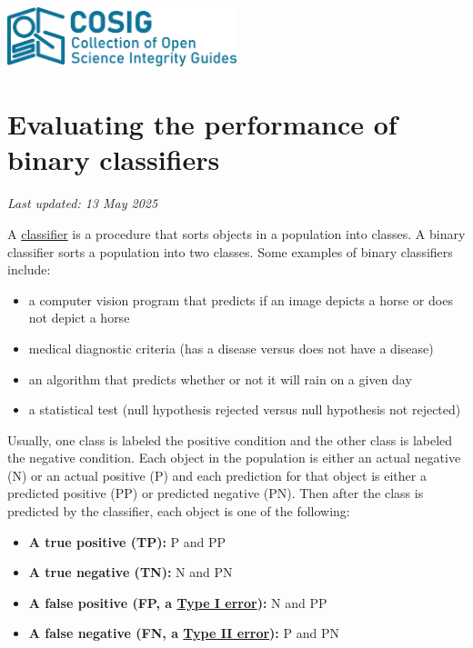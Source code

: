 \documentclass[letterpaper, 12pt]{article}
\begin{document}
\flushleft
\includegraphics[width=0.5\textwidth]{img/home/241017_final_logo_mockup.png}

\section*{Evaluating the performance of binary classifiers}
\textit{Last updated: 13 May 2025}

A \href{https://en.wikipedia.org/wiki/Classification_rule}{classifier} is a procedure that sorts objects in a population into classes. A binary classifier sorts a population into two classes. Some examples of binary classifiers include:

\begin{itemize}
    \setlength\itemsep{-0.5em}
    \item a computer vision program that predicts if an image depicts a horse or does not depict a horse
    \item medical diagnostic criteria (has a disease versus does not have a disease)
    \item an algorithm that predicts whether or not it will rain on a given day
    \item a statistical test (null hypothesis rejected versus null hypothesis not rejected)
\end{itemize}

Usually, one class is labeled the positive condition and the other class is labeled the negative condition. Each object in the population is either an actual negative (N) or an actual positive (P) and each prediction for that object is either a predicted positive (PP) or predicted negative (PN). Then after the class is predicted by the classifier, each object is one of the following:

\begin{itemize}
    \setlength\itemsep{-0.5em}
    \item \textbf{A true positive (TP):} P and PP
    \item \textbf{A true negative (TN):} N and PN
    \item \textbf{A false positive (FP, a \href{https://en.wikipedia.org/wiki/Type_I_and_type_II_errors}{Type I error}):} N and PP
    \item \textbf{A false negative (FN, a \href{https://en.wikipedia.org/wiki/Type_I_and_type_II_errors}{Type II error}):} P and PN
\end{itemize}
\end{document}
